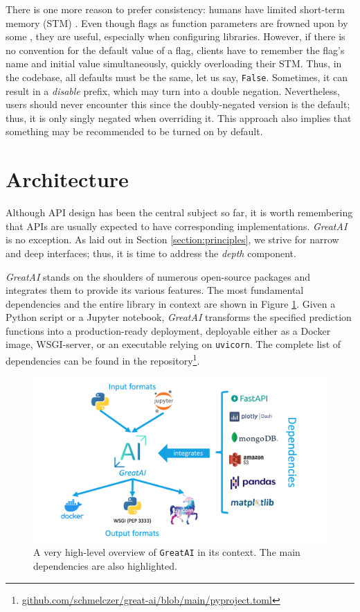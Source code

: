 There is one more reason to prefer consistency: humans have limited short-term memory (STM) \cite{miller1956magical}. Even though flags as function parameters are frowned upon by some \cite{martin2009clean}, they are useful, especially when configuring libraries. However, if there is no convention for the default value of a flag, clients have to remember the flag's name and initial value simultaneously, quickly overloading their STM. Thus, in the codebase, all defaults must be the same, let us say, \texttt{False}. Sometimes, it can result in a \textit{disable} prefix, which may turn into a double negation. Nevertheless, users should never encounter this since the doubly-negated version is the default; thus, it is only singly negated when overriding it. This approach also implies that something may be recommended to be turned on by default.

\section{Architecture} \label{section:architecture}

Although API design has been the central subject so far, it is worth remembering that APIs are usually expected to have corresponding implementations. \textit{GreatAI} is no exception. As laid out in Section \ref{section:principles}, we strive for narrow and deep interfaces; thus, it is time to address the \textit{depth} component.

\textit{GreatAI} stands on the shoulders of numerous open-source packages and integrates them to provide its various features. The most fundamental dependencies and the entire library in context are shown in Figure \ref{fig:technologies}. Given a Python script or a Jupyter notebook, \textit{GreatAI} transforms the specified prediction functions into a production-ready deployment, deployable either as a Docker image, WSGI-server, or an executable relying on \texttt{uvicorn}. The complete list of dependencies can be found in the repository\footnote{\href{https://github.com/schmelczer/great-ai/blob/main/pyproject.toml}{github.com/schmelczer/great-ai/blob/main/pyproject.toml}}.

\begin{figure}
    \centering
    \includegraphics[width=0.65\linewidth]{figures/technologies.png}
    \captionsetup{width=.9\linewidth}
    \caption{A very high-level overview of \texttt{GreatAI} in its context. The main dependencies are also highlighted.}
    \label{fig:technologies}
\end{figure}

